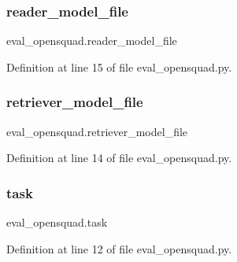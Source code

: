 \subsubsection{\texorpdfstring{reader\+\_\+model\+\_\+file}{reader\_model\_file}}
{\footnotesize\ttfamily eval\+\_\+opensquad.\+reader\+\_\+model\+\_\+file}



Definition at line 15 of file eval\+\_\+opensquad.\+py.

\mbox{\label{namespaceeval__opensquad_a1b91b7e4d8f5530980d01ab7e334d669}} 
\subsubsection{\texorpdfstring{retriever\+\_\+model\+\_\+file}{retriever\_model\_file}}
{\footnotesize\ttfamily eval\+\_\+opensquad.\+retriever\+\_\+model\+\_\+file}



Definition at line 14 of file eval\+\_\+opensquad.\+py.

\mbox{\label{namespaceeval__opensquad_a9690deec3ddf1fe5126cbd9fa8147cc7}} 
\subsubsection{\texorpdfstring{task}{task}}
{\footnotesize\ttfamily eval\+\_\+opensquad.\+task}



Definition at line 12 of file eval\+\_\+opensquad.\+py.

